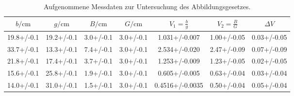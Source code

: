 \begin{table}
  \caption{Aufgenommene Messdaten zur Untersuchung des Abbildungsgesetzes.}
  \label{tab:groesse}
  \centering
\begin{tabular}{ccccccc}
  \toprule
  $b/\si{\centi\meter} $& $g/\si{\centi\meter} $& $B/\si{\centi\meter} $& $G/\si{\centi\meter}$ &$ V_{\mathrm{1}}=\frac{b}{g}$ & $V_\mathrm{2}=\frac{B}{G}$ & $\Delta V$ \\
\midrule
  19.8+/-0.1 & 19.2+/-0.1 & 3.0+/-0.1 & 3.0+/-0.1 & 1.031+/-0.007 & 1.00+/-0.05 & 0.03+/-0.05 \\
  33.7+/-0.1 & 13.3+/-0.1 & 7.4+/-0.1 & 3.0+/-0.1 & 2.534+/-0.020 & 2.47+/-0.09 & 0.07+/-0.09 \\
  21.8+/-0.1 & 17.4+/-0.1 & 3.7+/-0.1 & 3.0+/-0.1 & 1.253+/-0.009 & 1.23+/-0.05 & 0.02+/-0.05 \\
  15.6+/-0.1 & 25.8+/-0.1 & 1.9+/-0.1 & 3.0+/-0.1 & 0.605+/-0.005 & 0.63+/-0.04 & 0.03+/-0.04 \\
  14.0+/-0.1 & 31.0+/-0.1 & 1.5+/-0.1 & 3.0+/-0.1 & 0.4516+/-0.0035 & 0.50+/-0.04 & 0.05+/-0.04 \\
\bottomrule
\end{tabular}
\end{table}
\FloatBarrier
